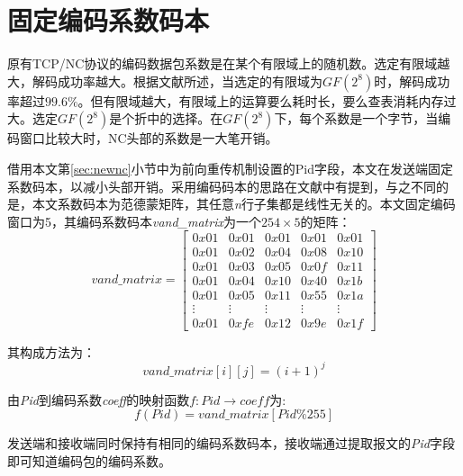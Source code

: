 \section{固定编码系数码本}
原有TCP/NC协议的编码数据包系数是在某个有限域上的随机数。选定有限域越大，解码成功率越大。根据文献\cite{4015738}所述，当选定的有限域为$GF\left(2^8\right)$时，解码成功率超过$99.6\%$。但有限域越大，有限域上的运算要么耗时长，要么查表消耗内存过大。选定$GF\left(2^8\right)$是个折中的选择。在$GF\left(2^8\right)$下，每个系数是一个字节，当编码窗口比较大时，NC头部的系数是一大笔开销。
\par
借用本文第\ref{sec:newnc}小节中为前向重传机制设置的Pid字段，本文在发送端固定系数码本，以减小头部开销。采用编码码本的思路在文献\cite{songmeng2015jiyu}中有提到，与之不同的是，本文系数码本为范德蒙矩阵，其任意\emph{n}行子集都是线性无关的。本文固定编码窗口为5，其编码系数码本\emph{vand\_matrix}为一个$254 \times 5$的矩阵：
\begin{equation}
	vand\_matrix=\left[ {\begin{array}{*{20}{c}}
		{0x01}&{0x01}&{0x01}&{0x01}&{0x01}\\
		{0x01}&{0x02}&{0x04}&{0x08}&{0x10}\\
		{0x01}&{0x03}&{0x05}&{0x0f}&{0x11}\\
		{0x01}&{0x04}&{0x10}&{0x40}&{0x1b}\\
		{0x01}&{0x05}&{0x11}&{0x55}&{0x1a}\\
		{\vdots}&{\vdots}&{\vdots}&{\vdots}&{\vdots}\\
		{0x01}&{0xfe}&{0x12}&{0x9e}&{0x1f}
		\end{array}} \right]
\end{equation}
\par
其构成方法为：
\begin{equation}
	vand\_matrix[i][j]=(i+1)^j
\end{equation}
\par
由\emph{Pid}到编码系数\emph{coeff}的映射函数$f:Pid \rightarrow coeff$为:
\begin{equation}
	f(Pid)=vand\_matrix[Pid\%255]
\end{equation}
\par
发送端和接收端同时保持有相同的编码系数码本，接收端通过提取报文的\emph{Pid}字段即可知道编码包的编码系数。
